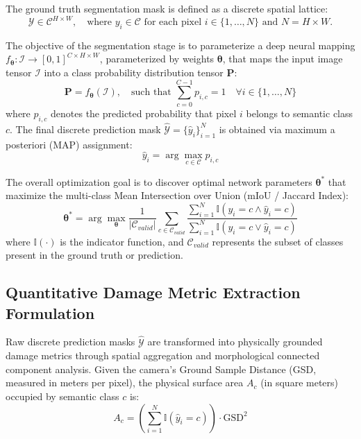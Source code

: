 The ground truth segmentation mask is defined as a discrete spatial lattice:
\begin{equation}
    \mathcal{Y} \in \mathcal{C}^{H \times W}, \quad \text{where } y_{i} \in \mathcal{C} \text{ for each pixel } i \in \{1, \dots, N\} \text{ and } N = H \times W.
\end{equation}

The objective of the segmentation stage is to parameterize a deep neural mapping $f_{\boldsymbol{\theta}}: \mathcal{I} \rightarrow [0, 1]^{C \times H \times W}$, parameterized by weights $\boldsymbol{\theta}$, that maps the input image tensor $\mathcal{I}$ into a class probability distribution tensor $\mathbf{P}$:
\begin{equation}
    \mathbf{P} = f_{\boldsymbol{\theta}}(\mathcal{I}), \quad \text{such that } \sum_{c=0}^{C-1} p_{i, c} = 1 \quad \forall i \in \{1, \dots, N\}
\end{equation}
where $p_{i, c}$ denotes the predicted probability that pixel $i$ belongs to semantic class $c$. The final discrete prediction mask $\hat{\mathcal{Y}} = \{\hat{y}_i\}_{i=1}^N$ is obtained via maximum a posteriori (MAP) assignment:
\begin{equation}
    \hat{y}_i = \arg\max_{c \in \mathcal{C}} p_{i, c}
\end{equation}

The overall optimization goal is to discover optimal network parameters $\boldsymbol{\theta}^*$ that maximize the multi-class Mean Intersection over Union (mIoU / Jaccard Index):
\begin{equation}
    \boldsymbol{\theta}^* = \arg\max_{\boldsymbol{\theta}} \frac{1}{|\mathcal{C}_{valid}|} \sum_{c \in \mathcal{C}_{valid}} \frac{\sum_{i=1}^N \mathbb{I}(y_i = c \land \hat{y}_i = c)}{\sum_{i=1}^N \mathbb{I}(y_i = c \lor \hat{y}_i = c)}
\end{equation}
where $\mathbb{I}(\cdot)$ is the indicator function, and $\mathcal{C}_{valid}$ represents the subset of classes present in the ground truth or prediction.

\subsection{Quantitative Damage Metric Extraction Formulation}
Raw discrete prediction masks $\hat{\mathcal{Y}}$ are transformed into physically grounded damage metrics through spatial aggregation and morphological connected component analysis. Given the camera's Ground Sample Distance (GSD, measured in meters per pixel), the physical surface area $A_c$ (in square meters) occupied by semantic class $c$ is:
\begin{equation}
    A_c = \left( \sum_{i=1}^N \mathbb{I}(\hat{y}_i = c) \right) \cdot \text{GSD}^2
\end{equation}

